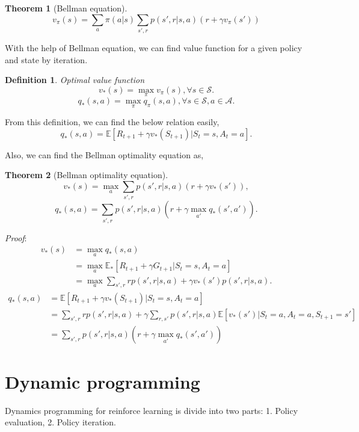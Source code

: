 \documentclass[11pt,a4paper]{article}
\def\S{{\mathcal S}}
\def\A{{\mathcal A}}
\def\E{\mathbb{E}}
\newtheorem{theorem}{Theorem}[subsection]
\newtheorem{definition}{Definition}[subsection]
\begin{document}
\begin{theorem}[Bellman equation]
\begin{equation}
v_{\pi}(s) = \sum_{a}\pi(a|s)\sum_{s',r}p(s',r|s,a)(r+\gamma v_{\pi}(s'))
\end{equation}
\end{theorem}
With the help of Bellman equation, we can find value function for a given policy and state by iteration.
\begin{definition}{Optimal value function}
\begin{equation}
v_*(s) = \max_{\pi} v_{\pi}(s), \forall s \in \S.
\end{equation}
\begin{equation}
q_*(s,a) = \max_{\pi}q_{\pi}(s,a), \forall s\in \S, a\in \A.
\end{equation}
\end{definition}
From this definition, we can find the below relation easily,
\begin{equation}
q_{*}(s,a) = \E[R_{t+1} + \gamma v_*(S_{t+1})|S_t=s,A_t=a].
\end{equation}

Also, we can find the Bellman optimality equation as,
\begin{theorem}[Bellman optimality equation]
\begin{equation}
v_*(s) = \max_{a}\sum_{s',r}p(s',r|s,a)(r+\gamma v_{*}(s')),
\end{equation}
\begin{equation}
q_{*}(s,a) = \sum_{s',r} p(s',r|s,a) (r+\gamma \max_{a'}q_{*}(s',a')).
\end{equation}
\end{theorem}
\emph{Proof}:
\begin{align}
v_*(s) & = \max_a q_{*}(s,a) \\ & = \max_a \E_*[R_{t+1}+\gamma G_{t+1}|S_t=s,A_t=a] \\ & = \max_a \sum_{s',r}rp(s',r|s,a) + \gamma v_*(s')p(s',r|s,a).
\end{align}
\begin{align}
q_{*}(s,a) & = \E[R_{t+1}+\gamma v_{*}(S_{t+1})|S_t=s,A_t=a]\\ & = \sum_{s',r} rp(s',r|s,a) + \gamma \sum_{r,s'}p(s',r|s,a)\E[v_{*}(s')|S_t=a,A_t =a, S_{t+1} =s'] \\ & = \sum_{s',r}p(s',r|s,a)(r + \gamma\max_{a'} q_{*}(s',a'))
\end{align}

\section{Dynamic programming}
Dynamics programming for reinforce learning is divide into two parts: 1. Policy evaluation, 2. Policy iteration. \par 
\end{document}
